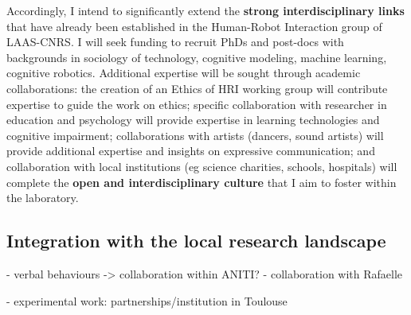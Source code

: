 Accordingly, I intend to significantly extend the \textbf{strong
interdisciplinary links} that have already been established in the Human-Robot
Interaction group of LAAS-CNRS. I will seek funding to recruit PhDs and
post-docs with backgrounds in sociology of technology, cognitive modeling,
machine learning, cognitive robotics. Additional expertise will be sought
through academic collaborations: the creation of an Ethics of HRI working group
will contribute expertise to guide the work on ethics; specific collaboration
with researcher in education and psychology will provide expertise in learning
technologies and cognitive impairment; collaborations with artists (dancers,
sound artists) will provide additional expertise and insights on expressive
communication; and collaboration with local institutions (eg science charities,
schools, hospitals) will complete the \textbf{open and interdisciplinary
culture} that I aim to foster within the laboratory.

\subsection{Integration with the local research landscape}\label{collaborations}


- verbal behaviours -> collaboration within ANITI?
- collaboration with Rafaelle

- experimental work: partnerships/institution in Toulouse
